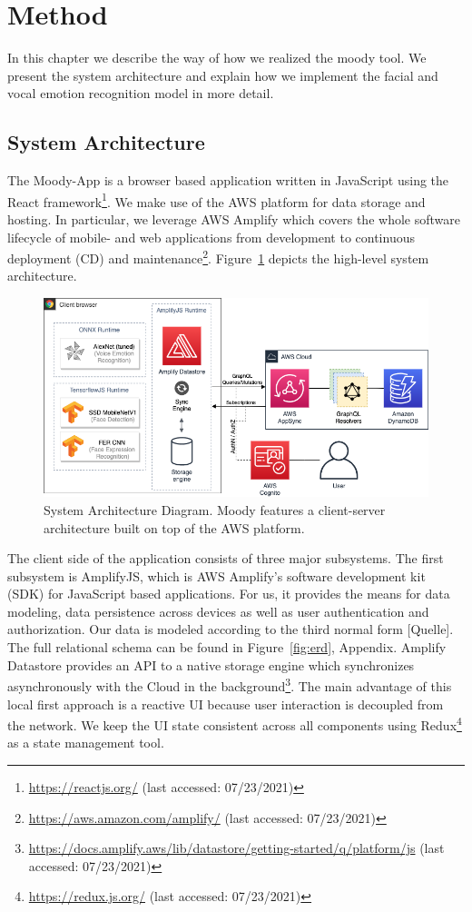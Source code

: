 \section{Method}
\label{sec:method}
In this chapter we describe the way of how we realized the moody tool. We present the system architecture and explain how we implement the facial and vocal emotion recognition model in more detail.

\subsection{System Architecture}
\label{subsec:method_system_architecture}
The Moody-App is a browser based application written in JavaScript using the React framework\footnote{\url{https://reactjs.org/} (last accessed: 07/23/2021)}. We make use of the AWS platform for data storage and hosting. In particular, we leverage AWS Amplify which covers the whole software lifecycle of mobile- and web applications from development to continuous deployment (CD) and maintenance\footnote{\url{https://aws.amazon.com/amplify/} (last accessed: 07/23/2021)}. Figure~\ref{fig:system_architecture} depicts the high-level system architecture.

\begin{figure}
\centering
\includegraphics[width=1\textwidth]{assets/system_architecture.png}
\caption{System Architecture Diagram. Moody features a client-server architecture built on top of the AWS platform.}
\label{fig:system_architecture}
\end{figure}

The client side of the application consists of three major subsystems. The first subsystem is AmplifyJS, which is AWS Amplify’s software development kit (SDK) for JavaScript based applications. For us, it provides the means for data modeling, data persistence across devices as well as user authentication and authorization. Our data is modeled according to the third normal form [Quelle]. The full relational schema can be found in Figure~\ref{fig:erd}, Appendix. Amplify Datastore provides an API to a native storage engine which synchronizes asynchronously with the Cloud in the background\footnote{\url{https://docs.amplify.aws/lib/datastore/getting-started/q/platform/js} (last accessed: 07/23/2021)}. The main advantage of this local first approach is a reactive UI because user interaction is decoupled from the network. We keep the UI state consistent across all components using Redux\footnote{\url{https://redux.js.org/} (last accessed: 07/23/2021)} as a state management tool.


